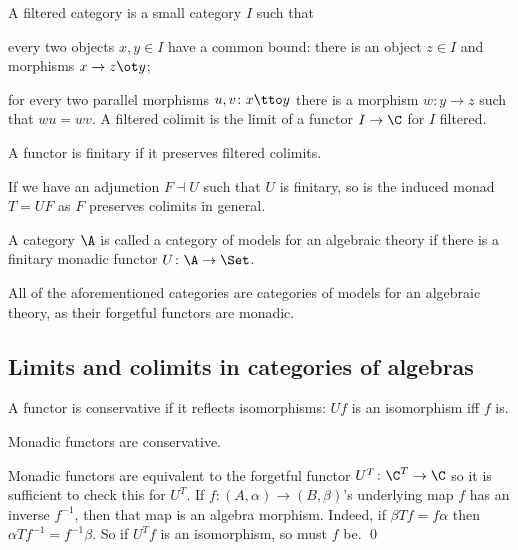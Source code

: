 \eexam

\bdefn

    A {\emphcolor filtered category} is a small category $I$ such that
    \benum
        \item every two objects $x,y\in I$ have a common bound: there is an object $z\in I$ and morphisms $x\to z\ot y$;
        \item for every two parallel morphisms $u,v\colon x\tto y$ there is a morphism $w\colon y\to z$ such that $wu=wv$.
    \eenum
    A {\emphcolor filtered colimit} is the limit of a functor $I\to\C$ for $I$ filtered.

    A functor is {\emphcolor finitary} if it preserves filtered colimits.

\edefn

If we have an adjunction $F\dashv U$ such that $U$ is finitary, so is the induced monad $T=UF$ as $F$ preserves colimits in general.

\bdefn

    A category $\A$ is called a {\emphcolor category of models for an algebraic theory} if there is a finitary monadic functor $U\colon\A\to\Set$.

\edefn

All of the aforementioned categories are categories of models for an algebraic theory, as their forgetful functors are monadic.

\subsection{Limits and colimits in categories of algebras}

\bdefn

    A functor is {\emphcolor conservative} if it reflects isomorphisms: $Uf$ is an isomorphism iff $f$ is.

\edefn

\blemm

    Monadic functors are conservative.

\elemm

\bproof

    Monadic functors are equivalent to the forgetful functor $U^T\colon\C^T\to\C$ so it is sufficient to check this for $U^T$.
    If $f\colon(A,\alpha)\to(B,\beta)$'s underlying map $f$ has an inverse $f^{-1}$, then that map is an algebra morphism.
    Indeed, if $\beta Tf=f\alpha$ then $\alpha Tf^{-1}=f^{-1}\beta$.
    So if $U^Tf$ is an isomorphism, so must $f$ be.
    \qed

\eproof

